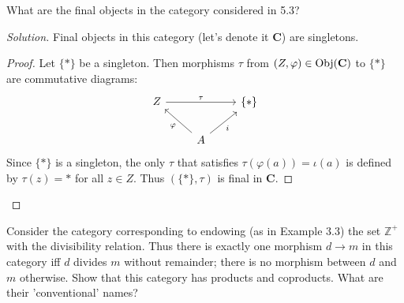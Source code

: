 \documentclass[12pt]{article}
\newenvironment{problem}[2][Problem]{\begin{trivlist}
\item[\hskip \labelsep {\bfseries #1}\hskip \labelsep {\bfseries #2.}]}{\end{trivlist}}
\newcommand{\catname}[1]{\normalfont\textbf{#1}}
\newcommand{\Objc}[1]{\text{Obj}(\catname{C})}
\newenvironment{solution}
  {\renewcommand\qedsymbol{$\blacksquare$}\begin{proof}[Solution]}
{\end{proof}}
\newenvironment{sproof}{
  \renewcommand\qedsymbol{$\square$}
  \begin{proof}
  }{
  \end{proof}
}
\begin{document}
\newpage

\begin{problem}{5.5}
  What are the final objects in the category considered in 5.3?
\end{problem}
\begin{solution}
  Final objects in this category (let's denote it \catname{C}) are singletons.
  \begin{sproof}
    Let $\{*\}$ be a singleton.
    Then morphisms $\tau$ from $(Z, \varphi) \in \Objc{C}$ to $\{*\}$ are commutative diagrams:
    \[\begin{tikzcd}
        Z \ar{rr}{\tau} && \{*\} \\
        & A \ar{ul}{\varphi} \ar{ur}[swap]{i}
    \end{tikzcd}\]
    Since $\{*\}$ is a singleton, the only $\tau$ that satisfies
    $\tau(\varphi(a)) = \iota(a)$ is defined by $\tau(z) = *$ for all $z\in Z$.
    Thus $(\{*\}, \tau)$ is final in \catname{C}.
  \end{sproof}
\end{solution}

\begin{problem}{5.6}
  Consider the category corresponding to endowing (as in Example 3.3) the set $\mathbb{Z}^+$ with the divisibility relation. 
  Thus there is exactly one morphism $d \to m$ in this category iff $d$ divides $m$ without remainder; there is no morphism between $d$ and $m$ otherwise.
  Show that this category has products and coproducts. What are their 'conventional' names?
\end{problem}
\end{document}
